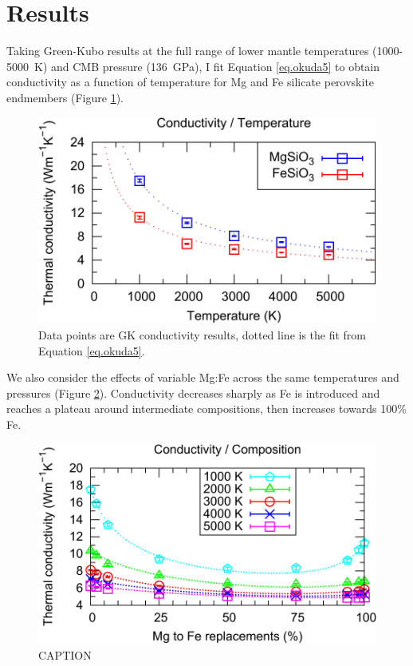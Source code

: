 \section{Results}
Taking Green-Kubo results at the full range of lower mantle temperatures (1000-5000~K) and CMB pressure (136~GPa), I fit Equation \ref{eq.okuda5} to obtain conductivity as a function of temperature for Mg and Fe silicate perovskite endmembers (Figure \ref{fig:kappa-temp_01}).
\begin{figure}[h!]
  \includegraphics[width=\linewidth]{Figures/k-t_all_01.png}
  \caption{Data points are GK conductivity results, dotted line is the fit from Equation \ref{eq.okuda5}.}
  \label{fig:kappa-temp_01}
\end{figure}

We also consider the effects of variable Mg:Fe across the same temperatures and pressures (Figure \ref{fig:kappa-comp_01}). Conductivity decreases sharply as Fe is introduced and reaches a plateau around intermediate compositions, then increases towards 100\% Fe. 

\begin{figure}[h!]
  \includegraphics[width=\linewidth]{Figures/k-c_all_01.png}
  \caption{CAPTION}
  \label{fig:kappa-comp_01}
\end{figure}

